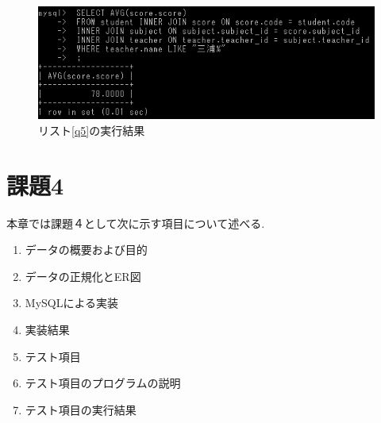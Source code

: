 \documentclass[a4j]{jarticle}
\begin{document}
    \begin{figure}[H]
      \centering
      \includegraphics[scale=1.2]{kadai3-5.png}
      \caption{リスト\ref{q5}の実行結果}
       \label{kadai3-5}
      \end{figure}

    \section{課題4}
    本章では課題４として次に示す項目について述べる.
    \begin{enumerate}
      \item データの概要および目的
      \item データの正規化とER図
      \item MySQLによる実装
      \item 実装結果
      \item テスト項目
      \item テスト項目のプログラムの説明
      \item テスト項目の実行結果
    \end{enumerate}
\end{document}
